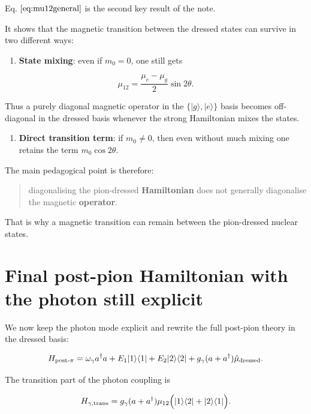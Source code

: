 \documentclass[
]{article}
\renewcommand{\[}{\begin{equation}}
\renewcommand{\]}{\end{equation}}
\providecommand{\tightlist}{%
  \setlength{\itemsep}{0pt}\setlength{\parskip}{0pt}}
\begin{document}
Eq. \(\ref{eq:mu12general}\) is the second key result of the note.

It shows that the magnetic transition between the dressed states can
survive in two different ways:

\begin{enumerate}
\def\labelenumi{\arabic{enumi}.}
\tightlist
\item
  \textbf{State mixing}: even if \(m_0 = 0\), one still gets
\end{enumerate}

\[
\mu_{12} =
\frac{\mu_e-\mu_g}{2}\sin 2\theta.
\label{eq:mu12mixingOnly}
\]

Thus a purely diagonal magnetic operator in the
\(\{|g\rangle,|e\rangle\}\) basis becomes off-diagonal in the dressed
basis whenever the strong Hamiltonian mixes the states.

\begin{enumerate}
\def\labelenumi{\arabic{enumi}.}
\setcounter{enumi}{1}
\tightlist
\item
  \textbf{Direct transition term}: if \(m_0 \neq 0\), then even without
  much mixing one retains the term \(m_0\cos 2\theta\).
\end{enumerate}

The main pedagogical point is therefore:

\begin{quote}
diagonalising the pion-dressed \textbf{Hamiltonian} does not generally
diagonalise the magnetic \textbf{operator}.
\end{quote}

That is why a magnetic transition can remain between the pion-dressed
nuclear states.

\section{Final post-pion Hamiltonian with the photon still
explicit}\label{final-post-pion-hamiltonian-with-the-photon-still-explicit}

We now keep the photon mode explicit and rewrite the full post-pion
theory in the dressed basis:

\[
H_{\rm post\text{-}\pi} =
\omega_\gamma a^\dagger a
+
E_1 |1\rangle\langle 1|
+
E_2 |2\rangle\langle 2|
+
g_\gamma (a+a^\dagger)\hat\mu_{\rm dressed}.
\label{eq:postPionHamiltonian}
\]

The transition part of the photon coupling is

\[
H_{\gamma,\rm trans} =
g_\gamma (a+a^\dagger)\mu_{12}
\Big(
|1\rangle\langle 2|
+
|2\rangle\langle 1|
\Big).
\label{eq:transitionPiece}
\]
\end{document}
